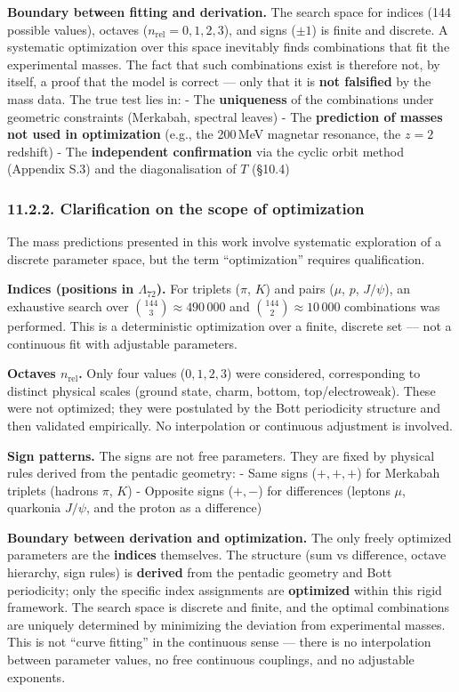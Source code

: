 \documentclass[11pt]{article}
\begin{document}
\textbf{Boundary between fitting and derivation.} The search space for
indices (144 possible values), octaves (\(n_{\text{rel}} = 0,1,2,3\)),
and signs (\(\pm 1\)) is finite and discrete. A systematic optimization
over this space inevitably finds combinations that fit the experimental
masses. The fact that such combinations exist is therefore not, by
itself, a proof that the model is correct --- only that it is
\textbf{not falsified} by the mass data. The true test lies in: - The
\textbf{uniqueness} of the combinations under geometric constraints
(Merkabah, spectral leaves) - The \textbf{prediction of masses not used
in optimization} (e.g., the 200\,MeV magnetar resonance, the \(z=2\)
redshift) - The \textbf{independent confirmation} via the cyclic orbit
method (Appendix S.3) and the diagonalisation of \(T\) (§10.4)

\hypertarget{clarification-on-the-scope-of-optimization}{%
\subsubsection{11.2.2. Clarification on the scope of
optimization}\label{clarification-on-the-scope-of-optimization}}

The mass predictions presented in this work involve systematic
exploration of a discrete parameter space, but the term ``optimization''
requires qualification.

\textbf{Indices (positions in \(\Lambda_{72}\)).} For triplets (\(\pi\),
\(K\)) and pairs (\(\mu\), \(p\), \(J/\psi\)), an exhaustive search over
\(\binom{144}{3} \approx 490\,000\) and
\(\binom{144}{2} \approx 10\,000\) combinations was performed. This is a
deterministic optimization over a finite, discrete set --- not a
continuous fit with adjustable parameters.

\textbf{Octaves \(n_{\text{rel}}\).} Only four values (\(0,1,2,3\)) were
considered, corresponding to distinct physical scales (ground state,
charm, bottom, top/electroweak). These were not optimized; they were
postulated by the Bott periodicity structure and then validated
empirically. No interpolation or continuous adjustment is involved.

\textbf{Sign patterns.} The signs are not free parameters. They are
fixed by physical rules derived from the pentadic geometry: - Same signs
(\(+,+,+\)) for Merkabah triplets (hadrons \(\pi\), \(K\)) - Opposite
signs (\(+,-\)) for differences (leptons \(\mu\), quarkonia \(J/\psi\),
and the proton as a difference)

\textbf{Boundary between derivation and optimization.} The only freely
optimized parameters are the \textbf{indices} themselves. The structure
(sum vs difference, octave hierarchy, sign rules) is \textbf{derived}
from the pentadic geometry and Bott periodicity; only the specific index
assignments are \textbf{optimized} within this rigid framework. The
search space is discrete and finite, and the optimal combinations are
uniquely determined by minimizing the deviation from experimental
masses. This is not ``curve fitting'' in the continuous sense --- there
is no interpolation between parameter values, no free continuous
couplings, and no adjustable exponents.
\end{document}
